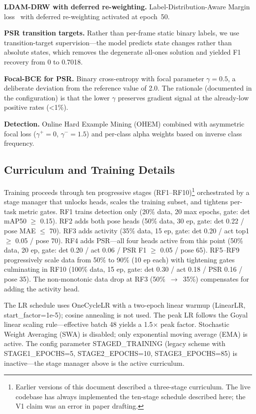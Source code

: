 \documentclass[conference]{IEEEtran}
\begin{document}
\textbf{LDAM-DRW with deferred re-weighting.} Label-Distribution-Aware Margin loss~\cite{cao2019ldam} with deferred re-weighting activated at epoch~50.

\textbf{PSR transition targets.} Rather than per-frame static binary labels, we use transition-target supervision---the model predicts state changes rather than absolute states, which removes the degenerate all-ones solution and yielded F1 recovery from 0 to 0.7018.

\textbf{Focal-BCE for PSR.} Binary cross-entropy with focal parameter $\gamma=0.5$, a deliberate deviation from the reference value of 2.0. The rationale (documented in the configuration) is that the lower $\gamma$ preserves gradient signal at the already-low positive rates (<1\%).

\textbf{Detection.} Online Hard Example Mining (OHEM) combined with asymmetric focal loss ($\gamma^+=0$, $\gamma^-=1.5$) and per-class alpha weights based on inverse class frequency.

\subsection{Curriculum and Training Details}
\label{sec:curriculum}

Training proceeds through ten progressive stages (RF1--RF10)\footnote{Earlier versions of this document described a three-stage curriculum. The live codebase has always implemented the ten-stage schedule described here; the V1 claim was an error in paper drafting.} orchestrated by a stage manager that unlocks heads, scales the training subset, and tightens per-task metric gates. RF1 trains detection only (20\% data, 20 max epochs, gate: det mAP50 $\ge$ 0.15). RF2 adds both pose heads (50\% data, 30 ep, gate: det 0.22 / pose MAE $\le$ 70). RF3 adds activity (35\% data, 15 ep, gate: det 0.20 / act top1 $\ge$ 0.05 / pose 70). RF4 adds PSR---all four heads active from this point (50\% data, 20 ep, gate: det 0.20 / act 0.06 / PSR F1 $\ge$ 0.05 / pose 65). RF5--RF9 progressively scale data from 50\% to 90\% (10 ep each) with tightening gates culminating in RF10 (100\% data, 15 ep, gate: det 0.30 / act 0.18 / PSR 0.16 / pose 35). The non-monotonic data drop at RF3 (50\%~$\to$~35\%) compensates for adding the activity head.

The LR schedule uses OneCycleLR with a two-epoch linear warmup (LinearLR, start\_factor=1e-5); cosine annealing is not used. The peak LR follows the Goyal linear scaling rule---effective batch 48 yields a 1.5$\times$ peak factor. Stochastic Weight Averaging (SWA) is disabled; only exponential moving average (EMA) is active. The config parameter STAGED\_TRAINING (legacy scheme with STAGE1\_EPOCHS=5, STAGE2\_EPOCHS=10, STAGE3\_EPOCHS=85) is inactive---the stage manager above is the active curriculum.
\end{document}
